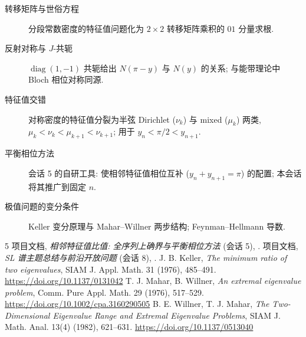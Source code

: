 \documentclass[UTF8]{ctexart}
\begin{document}
\begin{description}
	\item[转移矩阵与世俗方程] 分段常数密度的特征值问题化为 $2\times2$
		转移矩阵乘积的 $01$ 分量求根.
	\item[反射对称与 $J$-共轭] $\operatorname{diag}(1,-1)$ 共轭给出
		$N(\pi-y)$ 与 $N(y)$ 的关系; 与能带理论中 Bloch 相位对称同源.
	\item[特征值交错] 对称密度的特征值分裂为半弦 Dirichlet ($\nu_k$) 与
		mixed ($\mu_k$) 两类, $\mu_k < \nu_k < \mu_{k+1} < \nu_{k+1}$;
		用于 $y_n < \pi/2 < y_{n+1}$.
	\item[平衡相位方法] 会话 5 的自研工具: 使相邻特征值相位互补
		($y_n + y_{n+1} = \pi$) 的配置; 本会话将其推广到固定 $n$.
	\item[极值问题的变分条件] Keller 变分原理与 Mahar--Willner 两步结构;
		Feynman--Hellmann 导数.
\end{description}

\begin{thebibliography}{5}
 项目文档, \emph{相邻特征值比值: 全序列上确界与平衡相位方法}
	(会话 5), .
 项目文档, \emph{SL 谱主题总结与前沿开放问题} (会话 8),
	.
 J. B. Keller, \emph{The minimum ratio of two eigenvalues},
	SIAM J. Appl. Math. 31 (1976), 485--491. \url{https://doi.org/10.1137/0131042}
 T. J. Mahar, B. Willner, \emph{An extremal eigenvalue problem},
	Comm. Pure Appl. Math. 29 (1976), 517--529.
	\url{https://doi.org/10.1002/cpa.3160290505}
 B. E. Willner, T. J. Mahar, \emph{The Two-Dimensional Eigenvalue
	Range and Extremal Eigenvalue Problems}, SIAM J. Math. Anal.
	13(4) (1982), 621--631. \url{https://doi.org/10.1137/0513040}
\end{thebibliography}
\end{document}

